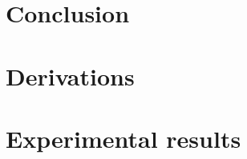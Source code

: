 \documentclass[a4paper,12pt,titlepage,twoside,openany]{book}
\begin{document}
\chapter{Conclusion}
\label{ch:conclusion}


 

\begin{appendices}

    \chapter{Derivations}
    \label{ch:derivations}
    

    \chapter{Experimental results}
    \label{ch:results_tables}
    

\end{appendices}
\end{document}
